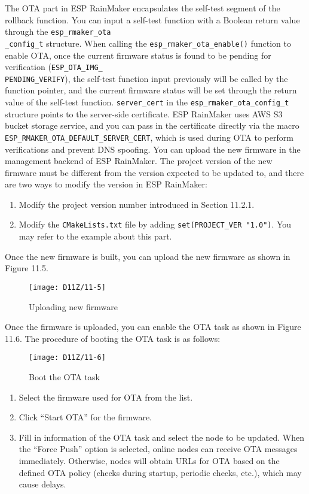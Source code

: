 \documentclass[a4paper,12pt]{book}
\begin{document}
The OTA part in ESP RainMaker encapsulates the self-test segment of the rollback function. You can input a self-test function with a Boolean return value through the \verb|esp_rmaker_ota|\\ \verb|_config_t| structure. When calling the \verb|esp_rmaker_ota_enable()| function to enable OTA, once the current firmware status is found to be pending for verification (\verb|ESP_OTA_IMG_|\\ \verb|PENDING_VERIFY|), the self-test function input previously will be called by the function pointer, and the current firmware status will be set through the return value of the self-test function. \verb|server_cert| in the \verb|esp_rmaker_ota_config_t| structure points to the server-side certificate. ESP RainMaker uses AWS S3 bucket storage service, and you can pass in the certificate directly via the macro \verb|ESP_RMAKER_OTA_DEFAULT_SERVER_CERT|, which is used during OTA to perform verifications and prevent DNS spoofing. You can upload the new firmware in the management backend of ESP RainMaker. The project version of the new firmware must be different from the version expected to be updated to, and there are two ways to modify the version in ESP RainMaker:

\begin{enumerate}[label=(\arabic*)]
    \item Modify the project version number introduced in Section 11.2.1.
    \item Modify the \verb|CMakeLists.txt| file by adding \verb|set(PROJECT_VER "1.0")|. You may refer to the example about this part.
\end{enumerate}

Once the new firmware is built, you can upload the new firmware as shown in Figure 11.5.

\begin{figure}[h!]
    \centering
    \texttt{[image: D11Z/11-5]}
    \caption{Uploading new firmware}
\end{figure}

Once the firmware is uploaded, you can enable the OTA task as shown in Figure 11.6. The procedure of booting the OTA task is as follows:

\begin{figure}[h!]
    \centering
    \texttt{[image: D11Z/11-6]}
    \caption{Boot the OTA task}
\end{figure}

\begin{enumerate}[label=(\arabic*)]
    \item Select the firmware used for OTA from the list.
    \item Click “Start OTA” for the firmware.
    \item Fill in information of the OTA task and select the node to be updated. When the “Force Push” option is selected, online nodes can receive OTA messages immediately. Otherwise, nodes will obtain URLs for OTA based on the defined OTA policy (checks during startup, periodic checks, etc.), which may cause delays.
\end{enumerate}
\end{document}
